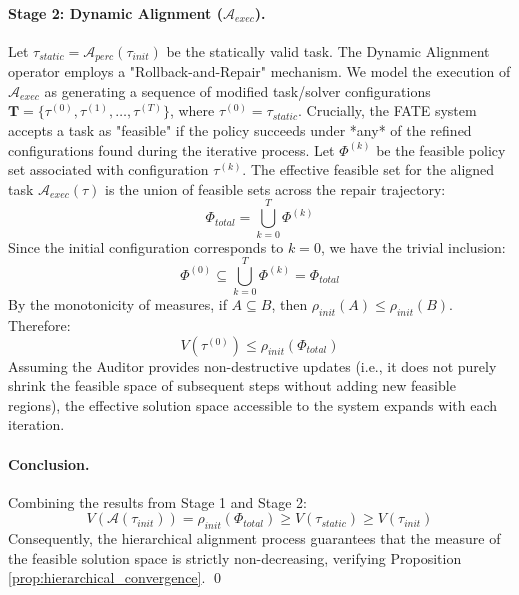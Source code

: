 \documentclass{article}
\theoremstyle{plain}
\theoremstyle{definition}
\theoremstyle{remark}
\begin{document}
\paragraph{Stage 2: Dynamic Alignment ($\mathcal{A}_{exec}$).}
Let $\tau_{static} = \mathcal{A}_{perc}(\tau_{init})$ be the statically valid task.
The Dynamic Alignment operator employs a "Rollback-and-Repair" mechanism. We model the execution of $\mathcal{A}_{exec}$ as generating a sequence of modified task/solver configurations $\mathbf{T} = \{ \tau^{(0)}, \tau^{(1)}, \dots, \tau^{(T)} \}$, where $\tau^{(0)} = \tau_{static}$.
Crucially, the FATE system accepts a task as "feasible" if the policy succeeds under *any* of the refined configurations found during the iterative process.
Let $\Phi^{(k)}$ be the feasible policy set associated with configuration $\tau^{(k)}$. The effective feasible set for the aligned task $\mathcal{A}_{exec}(\tau)$ is the union of feasible sets across the repair trajectory:
\begin{equation}
    \Phi_{total} = \bigcup_{k=0}^{T} \Phi^{(k)}
\end{equation}
Since the initial configuration corresponds to $k=0$, we have the trivial inclusion:
\begin{equation}
    \Phi^{(0)} \subseteq \bigcup_{k=0}^{T} \Phi^{(k)} = \Phi_{total}
\end{equation}
By the monotonicity of measures, if $A \subseteq B$, then $\rho_{init}(A) \le \rho_{init}(B)$. Therefore:
\begin{equation}
    V(\tau^{(0)}) \le \rho_{init}(\Phi_{total})
\end{equation}
Assuming the Auditor provides non-destructive updates (i.e., it does not purely shrink the feasible space of subsequent steps without adding new feasible regions), the effective solution space accessible to the system expands with each iteration.

\paragraph{Conclusion.}
Combining the results from Stage 1 and Stage 2:
\begin{equation}
    V(\mathcal{A}(\tau_{init})) = \rho_{init}(\Phi_{total}) \ge V(\tau_{static}) \ge V(\tau_{init})
\end{equation}
Consequently, the hierarchical alignment process guarantees that the measure of the feasible solution space is strictly non-decreasing, verifying Proposition \ref{prop:hierarchical_convergence}. \qed
\end{document}
